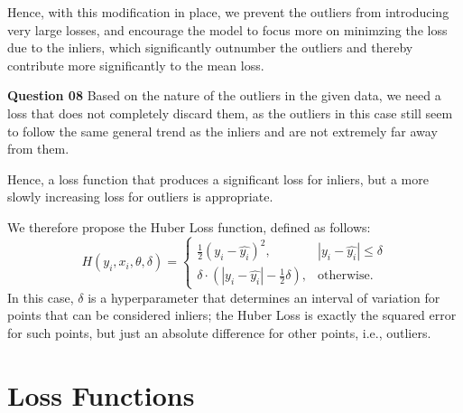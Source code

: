 \documentclass{article}[a4paper]
\begin{document}
	Hence, with this modification in place, we prevent the outliers from introducing very large losses, and encourage
	the model to focus more on minimzing the loss due to the inliers, which significantly outnumber the outliers and thereby contribute
	more significantly to the mean loss.
	\newline

	\textbf{Question 08} Based on the nature of the outliers in the given data, we need a loss that does not completely discard them, as
	the outliers in this case still seem to follow the same general trend as the inliers and are not extremely far away from them.
	\newline
	
	Hence, a loss function that produces a significant loss for inliers, but a more slowly increasing loss for outliers is appropriate.
	\newline

	We therefore propose the Huber Loss function, defined as follows: \[
		H\left( y_i, x_i, \theta, \delta \right) = \begin{cases}
			\frac{1}{2}\left(y_i - \hat{y_i}\right)^2,										& \left|y_i - \hat{y_i}\right| \leq \delta \\
			\delta \cdot \left( \left|y_i - \hat{y_i}\right| - \frac{1}{2}\delta \right),	& \text{otherwise}.
		\end{cases}
	\] In this case, $\delta$ is a hyperparameter that determines an interval of variation for points that can be considered inliers; the Huber
	Loss is exactly the squared error for such points, but just an absolute difference for other points, i.e., outliers.

	\section{Loss Functions}
\end{document}
